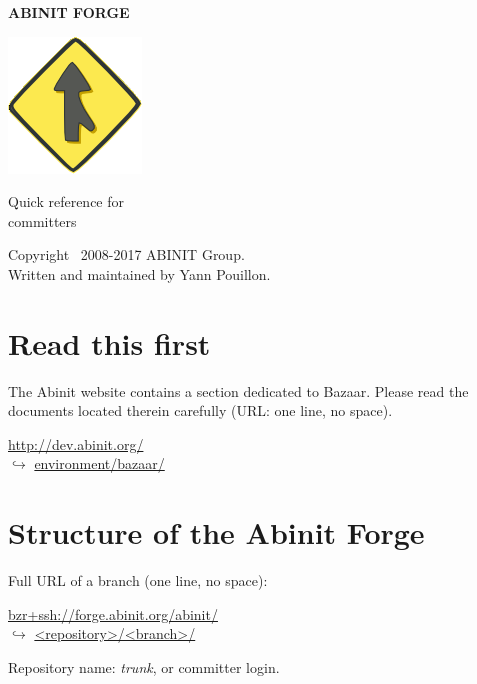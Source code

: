 \documentclass[tumble,foldmark,a4paper]{leaflet}
\begin{document}
\begin{center}
{\Large {\bf ABINIT FORGE}}

\vspace{32mm}

\includegraphics{bzr-logo}

\vspace{24mm}

{\Huge Quick reference for \\[0.5em] committers}

\vspace{40mm}

Copyright \textcopyright\ 2008-2017 ABINIT Group. \\
Written and maintained by Yann Pouillon.
\end{center}

\newpage

\section*{Read this first}

The Abinit website contains a section dedicated to Bazaar. Please read
the documents located therein carefully (URL: one line, no space).
\begin{center}
 \url{http://dev.abinit.org/} \\
 $\hookrightarrow$ \url{environment/bazaar/}
\end{center}

\section*{Structure of the Abinit Forge}

Full URL of a branch (one line, no space):
\begin{center}
 \url{bzr+ssh://forge.abinit.org/abinit/} \\
 $\hookrightarrow$ \url{<repository>/<branch>/}
\end{center}

Repository name: \textit{trunk}, or committer login. \\
\end{document}
